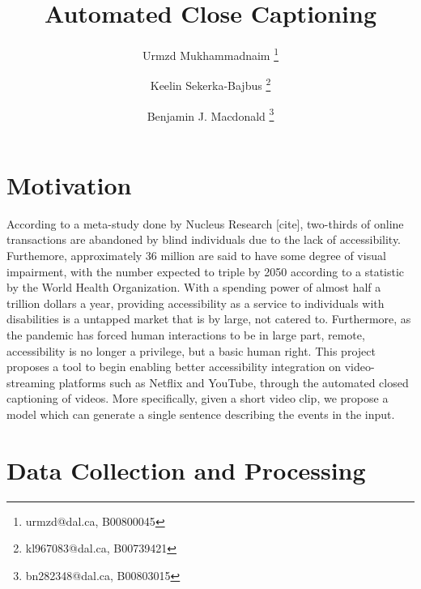 \documentclass[11pt]{article}
\title{Automated Close Captioning}
\author[1]{Urmzd Mukhammadnaim \thanks{urmzd@dal.ca, B00800045}}
\author[1]{Keelin Sekerka-Bajbus \thanks{kl967083@dal.ca, B00739421 }}
\author[1]{Benjamin J. Macdonald \thanks{bn282348@dal.ca, B00803015}}
\affil[1]{Faculty of Computer Science, Dalhousie University}
\begin{document}
\maketitle

\section{Motivation}
According to a meta-study done by Nucleus Research [cite], two-thirds
of online transactions are abandoned by blind individuals due to the lack of accessibility.
Furthemore, approximately 36 million are said to have some degree of visual impairment, with the number
expected to triple by 2050 according to a statistic by the World Health Organization.
With a spending power of almost half a trillion dollars a year, providing accessibility
as a service to individuals with disabilities is a untapped market that is by large, not catered to.
Furthermore, as the pandemic has forced human interactions to be in large part, remote, accessibility is no longer
a privilege, but a basic human right. This project proposes a tool to begin enabling better accessibility
integration on video-streaming platforms such as Netflix and YouTube, through the automated
closed captioning of videos. More specifically, given a short video clip, we propose a model which
can generate a single sentence describing the events in the input. 

\section{Data Collection and Processing}
\end{document}
